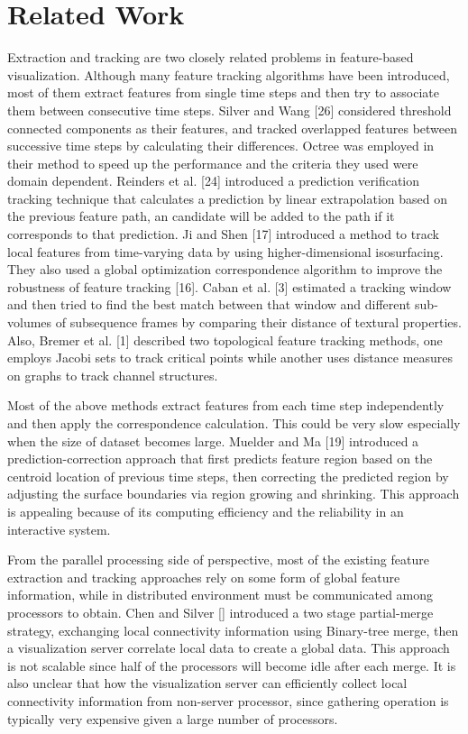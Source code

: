 \documentclass[10pt, conference, compsocconf]{IEEEtran}
\begin{document}
\section{Related Work}
Extraction and tracking are two closely related problems in feature-based visualization. Although many feature tracking algorithms have been introduced, most of them extract features from single time steps and then try to associate them between consecutive time steps. Silver and Wang [26] considered threshold connected components as their features, and tracked overlapped features between successive time steps by calculating their differences. Octree was employed in their method to speed up the performance and the criteria they used were domain dependent. Reinders et al. [24] introduced a prediction verification tracking technique that calculates a prediction by linear extrapolation based on the previous feature path, an candidate will be added to the path if it corresponds to that prediction. Ji and Shen [17] introduced a method to track local features from time-varying data by using higher-dimensional isosurfacing. They also used a global optimization correspondence algorithm to improve the robustness of feature tracking [16]. Caban et al. [3] estimated  a tracking window and then tried to find the best match between that window and different sub-volumes of subsequence frames by comparing their distance of textural properties.  Also, Bremer et al. [1] described two topological feature tracking methods, one employs Jacobi sets to track critical points while another uses distance measures on graphs to track channel structures. 

Most of the above methods extract features from each time step independently and then apply the correspondence calculation. This could be very slow especially when the size of dataset becomes large. Muelder and Ma [19] introduced a prediction-correction approach that first predicts feature region based on the centroid location of previous time steps, then correcting the predicted region by adjusting the surface boundaries via region growing and shrinking. This approach is appealing because of its computing efficiency and the reliability in an interactive system.

From the parallel processing side of perspective, most of the existing feature extraction and tracking approaches rely on some form of global feature information, while in distributed environment must be communicated among processors to obtain. Chen and Silver [] introduced a two stage partial-merge strategy, exchanging local connectivity information using Binary-tree merge, then a visualization server correlate local data to create a global data. This approach is not scalable since half of the processors will become idle after each merge. It is also unclear that how the visualization server can efficiently collect local connectivity information from non-server processor, since gathering operation is typically very expensive given a large number of processors. 
\end{document}
